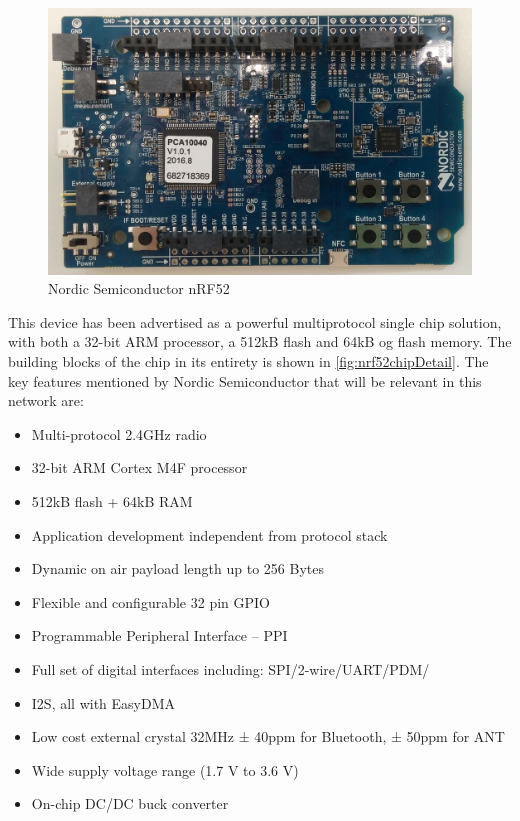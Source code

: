 \begin{figure}[ht]
    \centering
    \includegraphics[width=1.0\textwidth]{nRF522.png}    
    \caption{Nordic Semiconductor nRF52 }
    \label{fig:nrf52picture}
\end{figure}


\noindent This device has been advertised as a powerful multiprotocol single chip solution, with both a 32-bit ARM processor, a 512kB flash and 64kB og flash memory. The building blocks of the chip in its entirety is shown in \ref{fig:nrf52chipDetail}. The key features mentioned by Nordic Semiconductor \cite{nrf52Nordic} that will be relevant in this network are: 

\begin{itemize}
	\item Multi-protocol 2.4GHz radio
	\item 32-bit ARM Cortex M4F processor
	\item 512kB flash + 64kB RAM
	\item Application development independent from protocol stack
	\item Dynamic on air payload length up to 256 Bytes
	\item Flexible and configurable 32 pin GPIO
	\item Programmable Peripheral Interface – PPI
	\item Full set of digital interfaces including: SPI/2-wire/UART/PDM/
	\item I2S, all with EasyDMA
	\item Low cost external crystal 32MHz ± 40ppm for Bluetooth, ± 50ppm for ANT
	\item Wide supply voltage range (1.7 V to 3.6 V)
	\item On-chip DC/DC buck converter
\end{itemize}


